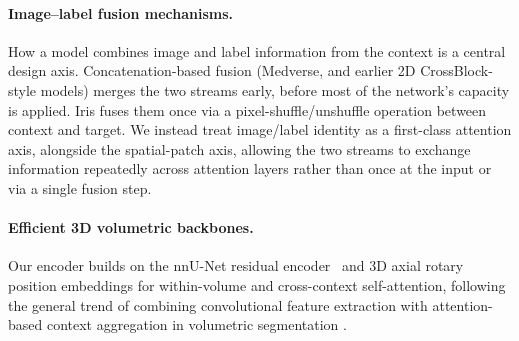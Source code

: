 \paragraph{Image--label fusion mechanisms.}
How a model combines image and label information from the context is a
central design axis. Concatenation-based fusion (Medverse, and earlier
2D CrossBlock-style models) merges the two streams early, before most of
the network's capacity is applied. Iris fuses them once via a
pixel-shuffle/unshuffle operation between context and target. We instead
treat image/label identity as a first-class attention axis, alongside
the spatial-patch axis, allowing the two streams to exchange information
repeatedly across attention layers rather than once at the input or via
a single fusion step. 

\paragraph{Efficient 3D volumetric backbones.}
Our encoder builds on the nnU-Net residual encoder~\cite{isensee2021nnu}
and 3D axial rotary position embeddings for within-volume and
cross-context self-attention, following the general trend of combining
convolutional feature extraction with attention-based context
aggregation in volumetric segmentation
\cite{hatamizadeh2022unetr,cciccek20163d}. 
